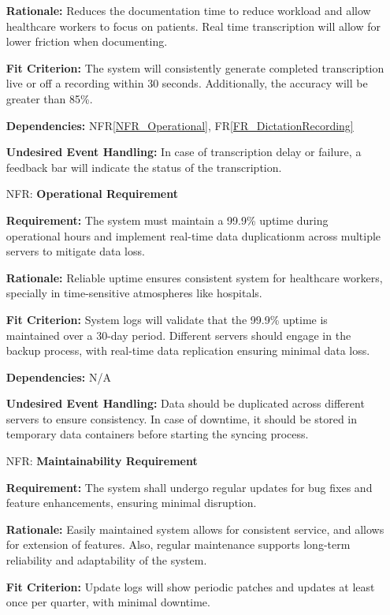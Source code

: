 \documentclass[12pt]{article}
\newcounter{nfrnum} %
\begin{document}
\begin{itemize}
    \textbf{Rationale:} Reduces the documentation time to reduce workload and allow healthcare workers to focus on patients. Real time transcription will allow for lower friction when documenting.
    
    \textbf{Fit Criterion:} The system will consistently generate completed transcription live or off a recording within 30 seconds. Additionally, the accuracy will be greater than 85\%.

    \textbf{Dependencies:} NFR\ref{NFR_Operational}, FR\ref{FR_DictationRecording}

    \textbf{Undesired Event Handling:} In case of transcription delay or failure, a feedback bar will indicate the status of the transcription.

\item[NFR\refstepcounter{nfrnum}\thenfrnum \label{NFR_Operational}:] \textbf{Operational Requirement}

    \textbf{Requirement:} The system must maintain a 99.9\% uptime during operational hours and implement real-time data duplicationm across multiple servers to mitigate data loss.

    \textbf{Rationale:} Reliable uptime ensures consistent system for healthcare workers, specially in time-sensitive atmospheres like hospitals.

    \textbf{Fit Criterion:} System logs will validate that the 99.9\% uptime is maintained over a 30-day period. Different servers should engage in the backup process, with real-time data replication ensuring minimal data loss. 

    \textbf{Dependencies:} N/A
    
    \textbf{Undesired Event Handling:} Data should be duplicated across different servers to ensure consistency. In case of downtime, it should be stored in temporary data containers before starting the syncing process.

\item[NFR\refstepcounter{nfrnum}\thenfrnum \label{NFR_Maintainability}:] \textbf{Maintainability Requirement}

    \textbf{Requirement:} The system shall undergo regular updates for bug fixes and feature enhancements, ensuring minimal disruption.

    \textbf{Rationale:} Easily maintained system allows for consistent service, and allows for extension of features. Also, regular maintenance supports long-term reliability and adaptability of the system.

    \textbf{Fit Criterion:} Update logs will show periodic patches and updates at least once per quarter, with minimal downtime.


\end{itemize}
\end{document}
